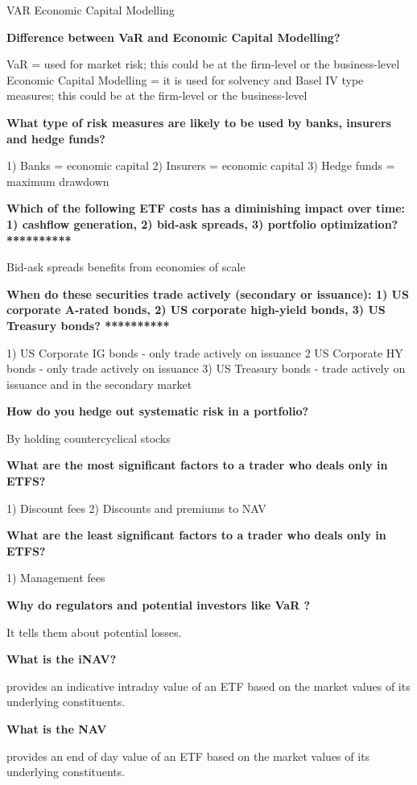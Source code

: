 \documentclass[12pt]{article}
\begin{document}
{VAR
Economic Capital Modelling

\textbf{Difference between VaR and Economic Capital Modelling?}

VaR = used for market risk; this could be at the firm-level or the business-level
Economic Capital Modelling = it is used for solvency and Basel IV type measures; this could be at the firm-level or the business-level

\textbf{What type of risk measures are likely to be used by banks, insurers and hedge funds?}

1) Banks = economic capital
2) Insurers = economic capital
3) Hedge funds = maximum drawdown

\textbf{Which of the following ETF costs has a diminishing impact over time: 1) cashflow generation, 2) bid-ask spreads, 3) portfolio optimization? **********}

Bid-ask spreads benefits from economies of scale

\textbf{When do these securities trade actively (secondary or issuance): 1) US corporate A-rated bonds, 2) US corporate high-yield bonds, 3) US Treasury bonds? **********}

1) US Corporate IG bonds - only trade actively on issuance
2 US Corporate HY bonds  - only trade actively on issuance
3) US Treasury bonds - trade actively on issuance and in the secondary market


\textbf{How do you hedge out systematic risk in a portfolio?}

By holding countercyclical stocks

\textbf{What are the most significant factors to a trader who deals only in ETFS?}

1) Discount fees
2) Discounts and premiums to NAV

\textbf{What are the least significant factors to a trader who deals only in ETFS?}

1) Management fees

\textbf{Why do regulators and potential investors like  VaR ?}

It tells them about potential losses.

\textbf{What is the iNAV?}

provides an  indicative intraday value of an ETF based on the market values of its underlying constituents.

\textbf{What is the NAV}

provides an  end of day  value of an ETF based on the market values of its underlying constituents.

}
\end{document}
